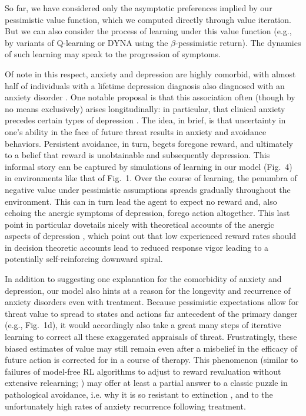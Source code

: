 \documentclass[11pt]{article} %
\begin{document}
So far, we have considered only the asymptotic preferences implied by our pessimistic value function, which we computed directly through value iteration. But we can also consider the process of learning under this value function (e.g., by variants of Q-learning\citep{SuttonBarto2018} or DYNA\citep{sutton1991, russek_predictive_2017} using the $\beta$-pessimistic return). The dynamics of such learning may speak to the progression of symptoms.

Of note in this respect, anxiety and depression are highly comorbid, with almost half of individuals with a lifetime depression diagnosis also diagnosed with an anxiety disorder \citep{kessler2015}. One notable proposal is that this association often (though by no means exclusively) arises longitudinally: in particular, that clinical anxiety precedes certain types of depression \citep{alloy1990, jacobson2014}. The idea, in brief, is that uncertainty in one's ability in the face of future threat results in anxiety and avoidance behaviors. Persistent avoidance, in turn, begets foregone reward, and ultimately to a belief that reward is unobtainable and subsequently depression. This informal story can be captured by simulations of learning in our model (Fig.~4) in environments like that of Fig.~1. Over the course of learning, the penumbra of negative value under pessimistic assumptions spreads gradually throughout the environment. This can in turn lead the agent to expect no reward and, also echoing the anergic symptoms of depression, forego action altogether. This last point in particular dovetails nicely with theoretical accounts of the anergic aspects of depression \citep{huys2015}, which point out that low experienced reward rates should in decision theoretic accounts lead to reduced response vigor \citep{niv2007} leading to a potentially self-reinforcing downward spiral.

In addition to suggesting one explanation for the comorbidity of anxiety and depression, our model also hints at a reason for the longevity and recurrence of anxiety disorders even with treatment. Because pessimistic expectations allow for threat value to spread to states and actions far antecedent of the primary danger (e.g., Fig.~1d), it would accordingly also take a great many steps of iterative learning to correct all these exaggerated appraisals of threat. Frustratingly, these biased estimates of value may still remain even after a misbelief in the efficacy of future action is corrected for in a course of therapy. This phenomenon (similar to failures of model-free RL algorithms to adjust to reward revaluation without extensive relearning; \cite{daw2005}) may offer at least a partial answer to a classic puzzle in pathological avoidance, i.e. why it is so resistant to extinction \cite{moutoussis2018}, and to the unfortunately high rates of anxiety recurrence following treatment\citep{pittig2018}.
\end{document}
